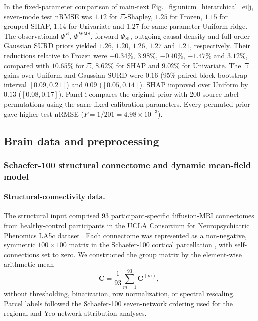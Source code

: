 \documentclass[fleqn,10pt]{wlscirep}
\begin{document}
In the fixed-parameter comparison of main-text Fig.~\ref{fig:unicm_hierarchical_ei}j, seven-mode test nRMSE was $1.12$ for $\Xi$-Shapley, $1.25$ for Frozen, $1.15$ for grouped SHAP, $1.14$ for Univariate and $1.27$ for same-parameter Uniform ridge. The observational $\Phi^R$, $\Phi^{\mathrm{WMS}}$, forward $\Phi_{\mathrm{SI}}$, outgoing causal-density and full-order Gaussian SURD priors yielded $1.26$, $1.20$, $1.26$, $1.27$ and $1.21$, respectively. Their reductions relative to Frozen were $-0.34\%$, $3.98\%$, $-0.40\%$, $-1.47\%$ and $3.12\%$, compared with $10.65\%$ for $\Xi$, $8.62\%$ for SHAP and $9.02\%$ for Univariate. The $\Xi$ gains over Uniform and Gaussian SURD were $0.16$ (95\% paired block-bootstrap interval $[0.09,0.21]$) and $0.09$ ($[0.05,0.14]$). SHAP improved over Uniform by $0.13$ ($[0.08,0.17]$). Panel \textbf{i} compares the original prior with 200 source-label permutations using the same fixed calibration parameters. Every permuted prior gave higher test nRMSE ($P=1/201=4.98\times10^{-3}$).


\subsection{Brain data and preprocessing}
\label{app:brain_data}

\subsubsection{Schaefer-100 structural connectome and dynamic mean-field model}
\label{app:dmf_schaefer100}

\paragraph{Structural-connectivity data.}
The structural input comprised 93 participant-specific diffusion-MRI connectomes from healthy-control participants in the UCLA Consortium for Neuropsychiatric Phenomics LA5c dataset \cite{Poldrack2016PhenomeWide}. Each connectome was represented as a non-negative, symmetric $100\times100$ matrix in the Schaefer-100 cortical parcellation \cite{Schaefer2018LocalGlobal}, with self-connections set to zero. We constructed the group matrix by the element-wise arithmetic mean
\begin{equation}
\mathbf{C}=\frac{1}{93}\sum_{m=1}^{93}\mathbf{C}^{(m)},
\label{eq:dmf_group_sc}
\end{equation}
without thresholding, binarization, row normalization, or spectral rescaling. Parcel labels followed the Schaefer-100 seven-network ordering used for the regional and Yeo-network attribution analyses.
\end{document}
